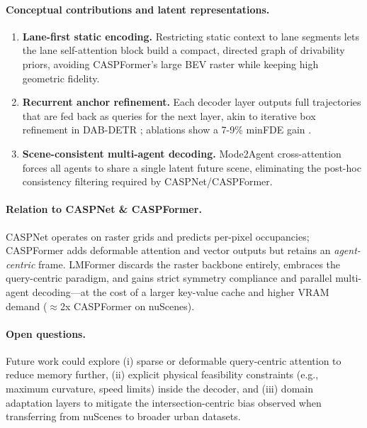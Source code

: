 \paragraph{Conceptual contributions and latent representations.}
\begin{enumerate}[leftmargin=*]
  \item \textbf{Lane-first static encoding.}  Restricting static context to
        lane segments lets the lane self-attention block build a compact,
        directed graph of drivability priors, avoiding CASPFormer's large BEV
        raster while keeping high geometric fidelity.
  \item \textbf{Recurrent anchor refinement.}  Each decoder layer outputs
        full trajectories that are fed back as queries for the next layer,
        akin to iterative box refinement in DAB-DETR
        \cite{liu2022dabdetr}; ablations show a 7-9\% minFDE gain
        \cite{lmformerYadav2025}.
  \item \textbf{Scene-consistent multi-agent decoding.}  Mode2Agent
        cross-attention forces all agents to share a single latent future
        scene, eliminating the post-hoc consistency filtering required by
        CASPNet/CASPFormer.
\end{enumerate}

\paragraph{Relation to CASPNet \& CASPFormer.}
CASPNet operates on raster grids and predicts per-pixel occupancies; CASPFormer adds deformable attention and vector outputs but retains an \emph{agent-centric} frame.  LMFormer discards the raster backbone entirely, embraces the query-centric paradigm, and gains strict symmetry compliance and parallel multi-agent decoding—at the cost of a larger key-value cache and higher VRAM demand (\( \approx \)2x CASPFormer on nuScenes).

\paragraph{Open questions.}
Future work could explore (i) sparse or deformable query-centric attention to reduce memory further, (ii) explicit physical feasibility constraints (e.g., maximum curvature, speed limits) inside the decoder, and (iii) domain adaptation layers to mitigate the intersection-centric bias observed when transferring from nuScenes to broader urban datasets\cite{lmformerYadav2025}.


